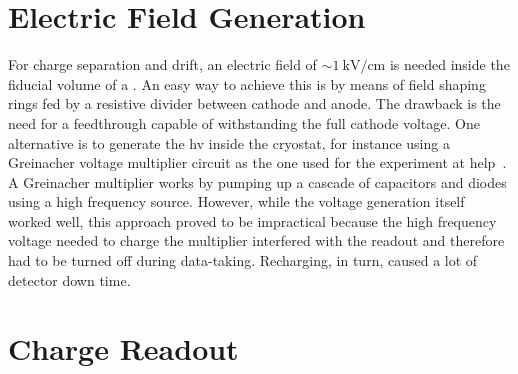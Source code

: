 

\section{Electric Field Generation}
\label{sec:lartpc_efield}

For charge separation and drift, an electric field of $\sim{\SI{1}{\kilo\volt\per\centi\metre}}$ is needed inside the fiducial volume of a \lartpc{}.
An easy way to achieve this is by means of field shaping rings fed by a resistive divider between cathode and anode.
The drawback is the need for a feedthrough capable of withstanding the full cathode voltage.
One alternative is to generate the \gls{hv} inside the cryostat, for instance using a Greinacher voltage multiplier circuit as the one used for the \AT{} experiment at \gls{help}~\cite{AT}.
A Greinacher multiplier works by pumping up a cascade of capacitors and diodes using a high frequency source.
However, while the voltage generation itself worked well, this approach proved to be impractical because the high frequency voltage needed to charge the multiplier interfered with the readout and therefore had to be turned off during data-taking.
Recharging, in turn, caused a lot of detector down time.


\section{Charge Readout}
\label{sec:lartpc_charge-ro}

